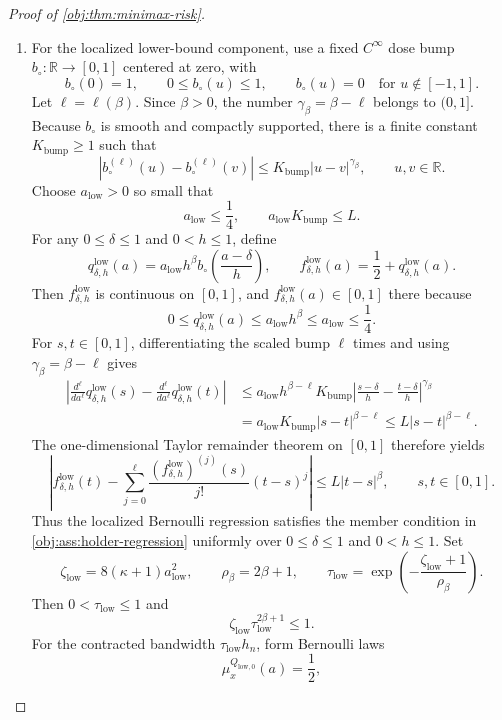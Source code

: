 \begin{proof}[Proof of \cref{obj:thm:minimax-risk}]
\begin{enumerate}
\item For the localized lower-bound component, use a fixed \(C^\infty\) dose bump
\(b_\circ:\mathbb R\to[0,1]\) centered at zero, with
\[
b_\circ(0)=1,
\qquad
0\le b_\circ(u)\le1,
\qquad
b_\circ(u)=0\quad\text{for }u\notin[-1,1].
\]
Let \(\ell=\ell(\beta)\).  Since \(\beta>0\), the number
\(\gamma_\beta=\beta-\ell\) belongs to \((0,1]\).  Because \(b_\circ\) is smooth and
compactly supported, there is a finite constant \(K_{\mathrm{bump}}\ge1\) such that
\[
\left|
b_\circ^{(\ell)}(u)-b_\circ^{(\ell)}(v)
\right|
\le
K_{\mathrm{bump}}|u-v|^{\gamma_\beta},
\qquad u,v\in\mathbb R.
\]
Choose \(a_{\mathrm{low}}>0\) so small that
\[
a_{\mathrm{low}}\le\frac14,
\qquad
a_{\mathrm{low}}K_{\mathrm{bump}}\le L .
\]
For any \(0\le\delta\le1\) and \(0<h\le1\), define
\[
q_{\delta,h}^{\mathrm{low}}(a)
=
a_{\mathrm{low}}h^\beta
b_\circ\!\left(\frac{a-\delta}{h}\right),
\qquad
f_{\delta,h}^{\mathrm{low}}(a)
=
\frac12+q_{\delta,h}^{\mathrm{low}}(a).
\]
Then \(f_{\delta,h}^{\mathrm{low}}\) is continuous on \([0,1]\), and
\(f_{\delta,h}^{\mathrm{low}}(a)\in[0,1]\) there because
\[
0\le q_{\delta,h}^{\mathrm{low}}(a)\le a_{\mathrm{low}}h^\beta\le a_{\mathrm{low}}\le\frac14 .
\]
For \(s,t\in[0,1]\), differentiating the scaled bump \(\ell\) times and using
\(\gamma_\beta=\beta-\ell\) gives
\[
\begin{aligned}
\left|
\frac{d^\ell}{da^\ell}q_{\delta,h}^{\mathrm{low}}(s)
-
\frac{d^\ell}{da^\ell}q_{\delta,h}^{\mathrm{low}}(t)
\right|
&\le
 a_{\mathrm{low}}h^{\beta-\ell}K_{\mathrm{bump}}
 \left|\frac{s-\delta}{h}-\frac{t-\delta}{h}\right|^{\gamma_\beta} \\
&=
 a_{\mathrm{low}}K_{\mathrm{bump}}|s-t|^{\beta-\ell}
\le
 L|s-t|^{\beta-\ell}.
\end{aligned}
\]
The one-dimensional Taylor remainder theorem on \([0,1]\) therefore yields
\[
\left|
f_{\delta,h}^{\mathrm{low}}(t)
-
\sum_{j=0}^{\ell}
\frac{(f_{\delta,h}^{\mathrm{low}})^{(j)}(s)}{j!}(t-s)^j
\right|
\le
L|t-s|^\beta,
\qquad s,t\in[0,1].
\]
Thus the localized Bernoulli regression satisfies the member condition in
\cref{obj:ass:holder-regression} uniformly over \(0\le\delta\le1\) and \(0<h\le1\).
Set
\[
\zeta_{\mathrm{low}}=8(\kappa+1)a_{\mathrm{low}}^2,
\qquad
\rho_\beta=2\beta+1,
\qquad
\tau_{\mathrm{low}}
=
\exp\!\left(-\frac{\zeta_{\mathrm{low}}+1}{\rho_\beta}\right).
\]
Then \(0<\tau_{\mathrm{low}}\le1\) and
\[
\zeta_{\mathrm{low}}\tau_{\mathrm{low}}^{2\beta+1}\le1.
\]
For the contracted bandwidth \(\tau_{\mathrm{low}}h_n\), form Bernoulli laws
\[
\mu_x^{Q_{\mathrm{low},0}}(a)=\frac12,
\]
\end{enumerate}
\end{proof}
